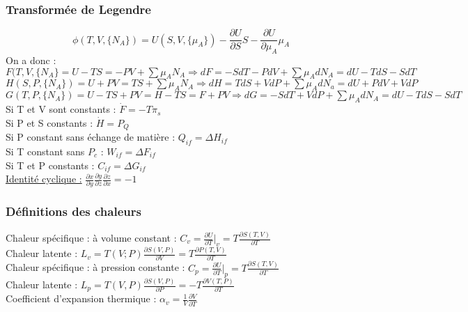 \documentclass[../main.tex]{subfiles}
\begin{document}
\subsubsection{Transformée de Legendre}
\begin{equation}
    \phi (T,V, \{N_A\}) = U(S,V,\{\mu_A\}) - \frac{\partial U}{\partial S}S - \frac{\partial U}{\partial \mu_A} \mu_A
\end{equation}
On a donc : $F(T,V, \{N_A\} = U -TS = -PV + \sum \mu_A N_A \Rightarrow dF = -SdT - PdV + \sum \mu_A dN_A = dU - TdS - SdT$ \\
$H(S,P, \{N_A\}) = U + PV = TS + \sum \mu_A N_A \Rightarrow dH = TdS + VdP + \sum \mu_A dN_a = dU + PdV + VdP$\\
$G(T,P,\{N_A\}) = U-TS + PV = H-TS = F+PV \Rightarrow dG = -SdT + VdP + \sum \mu_A dN_A = dU - TdS - SdT$\\

Si T et V sont constants : $\dot{F} = -T\pi_s$\\
Si P et S constants : $\dot{H} = P_Q$\\
Si P constant sans échange de matière : $Q_{if} = \Delta H_{if}$\\
Si T constant sans $P_c$ : $W_{if} = \Delta F_{if}$\\
Si T et P constants : $C_{if} = \Delta G_{if}$\\

\quad \underline{Identité cyclique :} $\frac{\partial x}{\partial y} \frac{\partial y}{\partial z} \frac{\partial z}{\partial x} = -1$\\


\subsubsection{Définitions des chaleurs}
Chaleur spécifique : à volume constant : $C_v = \frac{\partial U}{\partial T}\rvert_v = T \frac{\partial S(T,V)}{\partial T}$\\
Chaleur latente : $L_v = T(V;P) \frac{\partial S(V,P)}{\partial V} = T \frac{\partial P(T,V)}{\partial T}$\\
Chaleur spécifique : à pression constante : $C_p = \frac{\partial U}{\partial T}\rvert_p = T\frac{\partial S(T,V)}{\partial T}$\\
Chaleur latente : $L_p = T(V,P) \frac{\partial S(V,P)}{\partial P} = -T\frac{\partial V(T,P)}{\partial T}$\\

Coefficient d'expansion thermique : $\alpha_v = \frac{1}{V} \frac{\partial V}{\partial T}$\\
\end{document}
